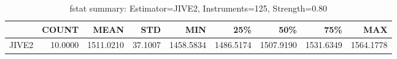 \begin{table}[ht]
\centering
\caption{fstat summary: Estimator=JIVE2, Instruments=125, Strength=0.80}
\begin{tabular}{lrrrrrrrr}
\toprule
 & COUNT & MEAN & STD & MIN & 25\% & 50\% & 75\% & MAX \\
\midrule
JIVE2 & 10.0000 & 1511.0210 & 37.1007 & 1458.5834 & 1486.5174 & 1507.9190 & 1531.6349 & 1564.1778 \\
\bottomrule
\end{tabular}
\end{table}

